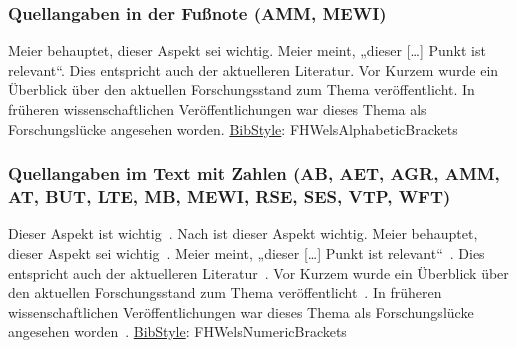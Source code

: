 \subsubsection{Quellangaben in der Fußnote (AMM, MEWI)}
Meier behauptet, dieser Aspekt sei wichtig.\newline
Meier meint, „dieser [\dots] Punkt ist relevant“.\newline
Dies entspricht auch der aktuelleren Literatur.\newline
Vor Kurzem wurde ein Überblick über den aktuellen Forschungsstand zum Thema veröffentlicht.\newline 
In früheren wissenschaftlichen Veröffentlichungen war dieses Thema als Forschungslücke angesehen worden.
\newline  
\underline{BibStyle}: \textsf{FHWelsAlphabeticBrackets}

\subsubsection{Quellangaben im Text mit Zahlen (AB, AET, AGR, AMM, AT, BUT, LTE, MB, MEWI, RSE, SES, VTP, WFT)}
Dieser Aspekt ist wichtig~\cite[vgl.][S. 5]{Meier:Globalisierung}.\newline
Nach \cite[S. 5]{Meier:Globalisierung} ist dieser Aspekt wichtig.\newline
Meier behauptet, dieser Aspekt sei wichtig~\cite[vgl.][S.~10]{Mueller:Meier}.\newline
Meier meint, „dieser […] Punkt ist relevant“~\cite[S.~5]{Mueller:Meier}.\newline
Dies entspricht auch der aktuelleren Literatur~\cite[vgl.][S.~10]{Mueller:Meier:Huber}.\newline
Vor Kurzem wurde ein Überblick über den aktuellen Forschungsstand zum Thema veröffentlicht~\cite[vgl.][S.~20-35]{Mueller:Meier:Huber:Tausch}.\newline
In früheren wissenschaftlichen Veröffentlichungen war dieses Thema als Forschungslücke angesehen worden~\cite[vgl.][S.~85]{Mueller:Meier:Huber:Tausch}.\newline
\underline{BibStyle}: \textsf{FHWelsNumericBrackets}

